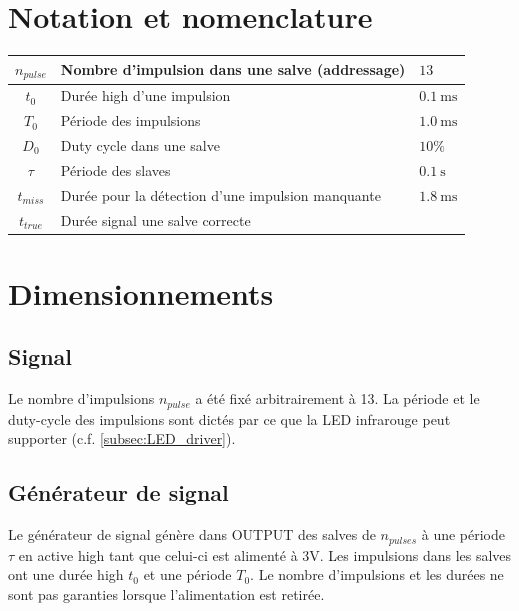 \documentclass[french]{layout/Report}
\begin{document}
\section{Notation et nomenclature}

\begin{center}
	\begin{tabular}{| c | l | l |}
		\hline
		$n_{pulse}$	& Nombre d'impulsion dans une salve (addressage) & $13$ \\ \hline
		$t_0$				& Durée high d'une impulsion & $\SI{0.1}{\milli\second}$	\\ \hline
		$T_0$				& Période des impulsions& $\SI{1.0}{\milli\second}$	\\ \hline
		$D_0$				& Duty cycle dans une salve & $10\%$	\\ \hline
		$\tau$			& Période des slaves	& $\SI{0.1}{\second}$\\ \hline
		$t_{miss}$  & Durée pour la détection d'une impulsion manquante & $\SI{1.8}{\milli\second}$ \\ \hline
		$t_{true}$  & Durée signal une salve correcte & \\ \hline
	\end{tabular}
\end{center}

\section{Dimensionnements}
\subsection{Signal}
Le nombre d'impulsions $n_{pulse}$ a été fixé arbitrairement à 13. La période et le duty-cycle des impulsions sont dictés par ce que la LED infrarouge peut supporter (c.f. \ref{subsec:LED_driver}).

\subsection{Générateur de signal}
Le générateur de signal génère dans OUTPUT des salves de $n_{pulses}$ à une période $\tau$ en active high tant que celui-ci est alimenté à 3V. Les impulsions dans les salves ont une durée high $t_0$ et une période $T_0$. Le nombre d'impulsions et les durées ne sont pas garanties lorsque l'alimentation est retirée.
\end{document}
